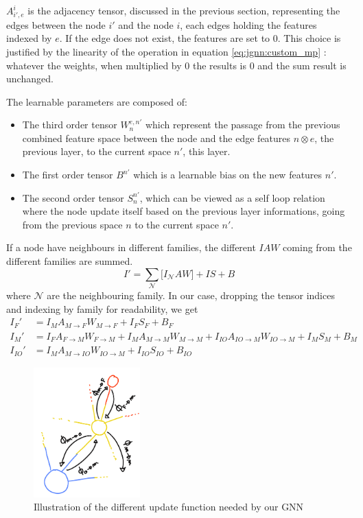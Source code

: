 \documentclass[../main.tex]{subfiles}
\begin{document}
$A_{i',e}^{i}$ is the adjacency tensor, discussed in the previous section, representing the edges between the node $i'$ and the node $i$, each edges holding the features indexed by $e$. If the edge does not exist, the features are set to 0. This choice is justified by the linearity of the operation in equation \ref{eq:jgnn:custom_mp} : whatever the weights, when multiplied by 0 the results is 0 and the sum result is unchanged.

The learnable parameters are composed of:
\begin{itemize}
  \item The third order tensor $W_n^{e,n'}$ which represent the passage from the previous combined feature space between the node and the edge features $n \otimes e$, the previous layer, to the current space $n'$, this layer.
  \item The first order tensor $B^{n'}$ which is a learnable bias on the new features $n'$.
  \item The second order tensor $S^{n'}_n$, which can be viewed as a self loop relation where the node update itself based on the previous layer informations, going from the previous space $n$ to the current space $n'$.
\end{itemize}

If a node have neighbours in different families, the different $IAW$ coming from the different families are summed.
\begin{equation}
  \label{eq:jgnn:multi_fam}
  I' = \sum_\mathcal{N} \bigg[ I_{\mathcal{N}}AW \bigg] + IS + B
\end{equation}
where $\mathcal{N}$ are the neighbouring family.
In our case, dropping the tensor indices and indexing by family for readability, we get
\begin{align}
  I_F' &= I_M A_{M \rightarrow F} W_{M \rightarrow F} + I_F S_F + B_F \\
  I_M' &= I_F A_{F \rightarrow M} W_{F \rightarrow M} + I_M A_{M \rightarrow M} W_{M \rightarrow M} + I_{IO} A_{IO \rightarrow M} W_{IO \rightarrow M} + I_M S_M + B_M \\
  I_{IO}' &= I_M A_{M \rightarrow IO} W_{IO \rightarrow M} + I_{IO} S_{IO} + B_{IO}
\end{align}

\begin{figure}
  \centering
  \includegraphics[height=5cm]{images/jgnn/mp_illus.png}
  \caption{Illustration of the different update function needed by our GNN}
  \label{fig:jgnn:mp_ill}
\end{figure}
\end{document}

